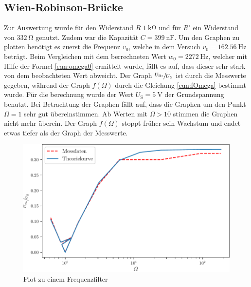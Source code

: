  \subsection{Wien-Robinson-Brücke}
 Zur Auswertung wurde für den Widerstand $R$ $\SI{1}{\kilo\ohm}$ und für $R'$ ein Widerstand von $\SI{332}{\ohm}$ genutzt.
 Zudem war die Kapazität $C=\SI{399}{\nano\farad}$.
 Um den Graphen zu plotten benötigt es zuerst die Frequenz $v_0$, welche in dem Versuch $v_0=\SI{162.56}{\hertz}$ beträgt.
 Beim Vergleichen mit dem berrechneten Wert $w_0= \SI{2272}{\hertz}$, welcher mit Hilfe der Formel \eqref{eqn:omega0} ermittelt wurde, fällt es auf, dass dieser
 sehr stark von dem beobachteten Wert abweicht.
Der Graph $\sfrac{U_\text{Br}}{U_S}$ ist durch die Messwerte gegeben, während der Graph $f(\Omega)$ durch die Gleichung \eqref{eqn:fOmega} bestimmt wurde. 
Für die berechnung wurde der Wert $U_\text{S}=\SI{5}{\volt}$ der Grundspannung benutzt.
Bei Betrachtung der Graphen fällt auf, dass die Graphen um den Punkt $\Omega=1$ sehr gut übereinstimmen.
Ab Werten mit $\Omega>10$ stimmen die Graphen nicht mehr überein. Der Graph $f(\Omega)$ stoppt früher sein Wachstum und endet etwas tiefer als der Graph der Messwerte.
\begin{figure}
  \caption{Plot zu einem Frequenzfilter}
  \centering
  \includegraphics[width = \textwidth]{build/plot.pdf}
\end{figure}
